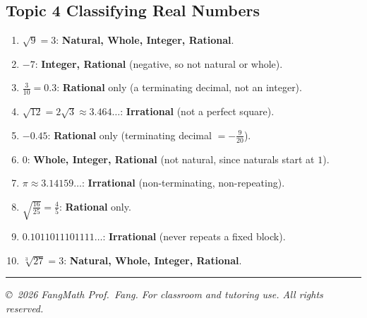 \documentclass[11pt]{article}
\begin{document}
\subsection*{Topic 4 \; \textbullet\; Classifying Real Numbers}
\begin{enumerate}[label=\textbf{\color{fangblue}\arabic*.},leftmargin=*,itemsep=5pt]
\item $\sqrt{9}=3$: \textbf{Natural, Whole, Integer, Rational}.
\item $-7$: \textbf{Integer, Rational} \;(negative, so not natural or whole).
\item $\frac{3}{10}=0.3$: \textbf{Rational} only \;(a terminating decimal, not an integer).
\item $\sqrt{12}=2\sqrt{3}\approx 3.464\ldots$: \textbf{Irrational} \;(not a perfect square).
\item $-0.45$: \textbf{Rational} only \;(terminating decimal $=-\tfrac{9}{20}$).
\item $0$: \textbf{Whole, Integer, Rational} \;(not natural, since naturals start at $1$).
\item $\pi\approx 3.14159\ldots$: \textbf{Irrational} \;(non-terminating, non-repeating).
\item $\sqrt{\frac{16}{25}}=\frac{4}{5}$: \textbf{Rational} only.
\item $0.1011011101111\ldots$: \textbf{Irrational} \;(never repeats a fixed block).
\item $\sqrt[3]{27}=3$: \textbf{Natural, Whole, Integer, Rational}.
\end{enumerate}

\vspace{10pt}
{\color{fangblue}\rule{\linewidth}{1.2pt}}
\begin{center}
\textcolor{fangmid}{\small\itshape
\copyright\ 2026 FangMath \; \textbullet\; Prof.\ Fang. \;
For classroom and tutoring use. All rights reserved.}
\end{center}
\end{document}
